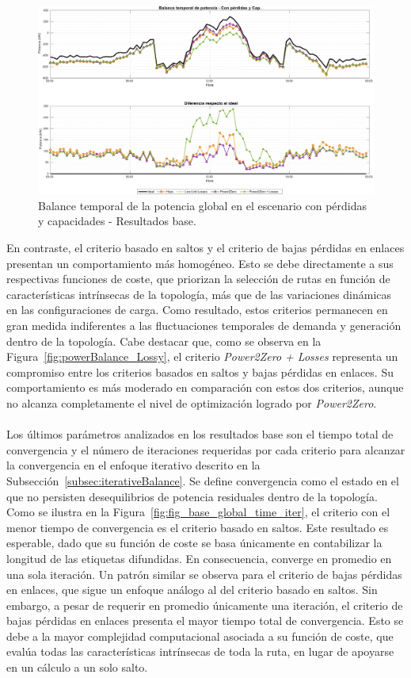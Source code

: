 \begin{figure}[ht!]
    \centering
    \includegraphics[width=\textwidth]{fig/07_bloste/bloste_10.pdf}
    \caption{Balance temporal de la potencia global en el escenario con pérdidas y capacidades - Resultados base.}
    \label{fig:fig_base_TempPowerBalance_LossyCap}
\end{figure}


En contraste, el criterio basado en saltos y el criterio de bajas pérdidas en enlaces presentan un comportamiento más homogéneo. Esto se debe directamente a sus respectivas funciones de coste, que priorizan la selección de rutas en función de características intrínsecas de la topología, más que de las variaciones dinámicas en las configuraciones de carga. Como resultado, estos criterios permanecen en gran medida indiferentes a las fluctuaciones temporales de demanda y generación dentro de la topología. Cabe destacar que, como se observa en la Figura~\ref{fig:powerBalance_Lossy}, el criterio \textit{Power2Zero + Losses} representa un compromiso entre los criterios basados en saltos y bajas pérdidas en enlaces. Su comportamiento es más moderado en comparación con estos dos criterios, aunque no alcanza completamente el nivel de optimización logrado por \textit{Power2Zero}.\\
\\
Los últimos parámetros analizados en los resultados base son el tiempo total de convergencia y el número de iteraciones requeridas por cada criterio para alcanzar la convergencia en el enfoque iterativo descrito en la Subsección~\ref{subsec:iterativeBalance}. Se define convergencia como el estado en el que no persisten desequilibrios de potencia residuales dentro de la topología. Como se ilustra en la Figura~\ref{fig:fig_base_global_time_iter}, el criterio con el menor tiempo de convergencia es el criterio basado en saltos. Este resultado es esperable, dado que su función de coste se basa únicamente en contabilizar la longitud de las etiquetas difundidas. En consecuencia, converge en promedio en una sola iteración. Un patrón similar se observa para el criterio de bajas pérdidas en enlaces, que sigue un enfoque análogo al del criterio basado en saltos.  Sin embargo, a pesar de requerir en promedio únicamente una iteración, el criterio de bajas pérdidas en enlaces presenta el mayor tiempo total de convergencia. Esto se debe a la mayor complejidad computacional asociada a su función de coste, que evalúa todas las características intrínsecas de toda la ruta, en lugar de apoyarse en un cálculo a un solo salto.

